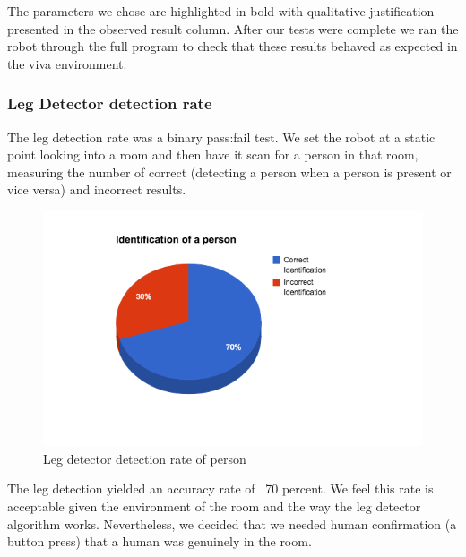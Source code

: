 \documentclass{article}
\begin{document}
 \begin{multicols}{2}
	The parameters we chose are highlighted in bold with qualitative justification presented in the observed result column. After our tests were complete we ran the robot through the full program to check that these results behaved as expected in the viva environment.
	
	\subsubsection{Leg Detector detection rate}
	The leg detection rate was a binary pass:fail test. We set the robot at a static point looking into a room and then have it scan for a person in that room, measuring the number of correct (detecting a person when a person is present or vice versa) and incorrect results.
	\begin{figure}[H]
	\centering
	\includegraphics[width=\linewidth]{ExperimentalResults11}
	\caption{Leg detector detection rate of person}
	\end{figure}
	The leg detection yielded an accuracy rate of ~70 percent. We feel this rate is acceptable given the environment of the room and the way the leg detector algorithm works. Nevertheless, we decided that we needed human confirmation (a button press) that a human was genuinely in the room.
	

\end{multicols}
\end{document}

